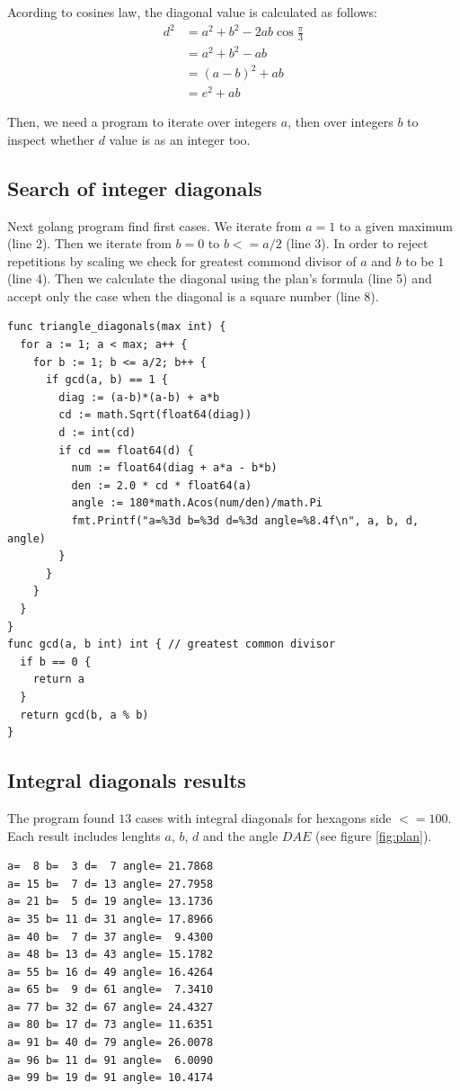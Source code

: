 \documentclass[11pt]{article}
\begin{document}
Acording to cosines law, the diagonal value is calculated as follows:
\begin{align*}
d^2 &= a^2 + b^2 - 2ab\cos{\frac{\pi}{3}}\\
    &= a^2 + b^2 - ab\\
    &= (a-b)^2 + ab\\
    &= e^2 + ab
\end{align*}

Then, we need a program to iterate over integers $a$, then over integers $b$ to inspect whether $d$ value is as an integer too.

\subsection{Search of integer diagonals}

Next golang program find first cases.
We iterate from $a=1$ to a given maximum (line 2).
Then we iterate from $b=0$ to $b <= a/2$ (line 3).
In order to reject repetitions by scaling we check for greatest commond divisor
of $a$ and $b$ to be $1$ (line 4).
Then we calculate the diagonal using the plan's formula (line 5) and accept
only the case when the diagonal is a square number (line 8). 

\begin{lstlisting}
func triangle_diagonals(max int) {
  for a := 1; a < max; a++ {
    for b := 1; b <= a/2; b++ {
      if gcd(a, b) == 1 {
        diag := (a-b)*(a-b) + a*b
        cd := math.Sqrt(float64(diag))
        d := int(cd)
        if cd == float64(d) {
          num := float64(diag + a*a - b*b)
          den := 2.0 * cd * float64(a)
          angle := 180*math.Acos(num/den)/math.Pi
          fmt.Printf("a=%3d b=%3d d=%3d angle=%8.4f\n", a, b, d, angle)
        }
      }
    }
  }
}
func gcd(a, b int) int { // greatest common divisor
  if b == 0 {
    return a
  }
  return gcd(b, a % b)
}
\end{lstlisting}

\subsection{Integral diagonals results}
The program found $13$ cases with integral diagonals for hexagons side $<= 100$.
Each result includes lenghts $a$, $b$, $d$ and the angle $DAE$ (see figure \ref{fig:plan}).

\begin{lstlisting}
a=  8 b=  3 d=  7 angle= 21.7868
a= 15 b=  7 d= 13 angle= 27.7958
a= 21 b=  5 d= 19 angle= 13.1736
a= 35 b= 11 d= 31 angle= 17.8966
a= 40 b=  7 d= 37 angle=  9.4300
a= 48 b= 13 d= 43 angle= 15.1782
a= 55 b= 16 d= 49 angle= 16.4264
a= 65 b=  9 d= 61 angle=  7.3410
a= 77 b= 32 d= 67 angle= 24.4327
a= 80 b= 17 d= 73 angle= 11.6351
a= 91 b= 40 d= 79 angle= 26.0078
a= 96 b= 11 d= 91 angle=  6.0090
a= 99 b= 19 d= 91 angle= 10.4174
\end{lstlisting}
\end{document}
